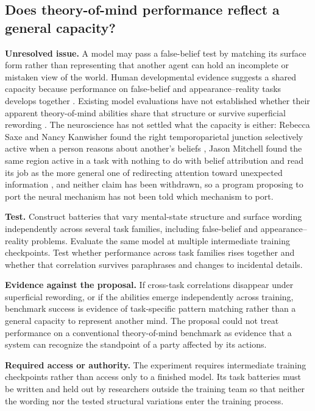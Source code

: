 \subsection*{Does theory-of-mind performance reflect a general capacity?}
\label{sec:A.tom}
\textbf{Unresolved issue.}
A model may pass a false-belief test by matching its surface form rather than representing that another agent can hold an incomplete or mistaken view of the world. Human developmental evidence suggests a shared capacity because performance on false-belief and appearance–reality tasks develops together \autocite{gopnik1988childrens}. Existing model evaluations have not established whether their apparent theory-of-mind abilities share that structure or survive superficial rewording \autocite{ullman2023large}. The neuroscience has not settled what the capacity is either: Rebecca Saxe and Nancy Kanwisher found the right temporoparietal junction selectively active when a person reasons about another's beliefs \autocite{saxe2003people}, Jason Mitchell found the same region active in a task with nothing to do with belief attribution and read its job as the more general one of redirecting attention toward unexpected information \autocite{mitchell2008activity}, and neither claim has been withdrawn, so a program proposing to port the neural mechanism has not been told which mechanism to port.

\textbf{Test.}
Construct batteries that vary mental-state structure and surface wording independently across several task families, including false-belief and appearance–reality problems. Evaluate the same model at multiple intermediate training checkpoints. Test whether performance across task families rises together and whether that correlation survives paraphrases and changes to incidental details.

\textbf{Evidence against the proposal.}
If cross-task correlations disappear under superficial rewording, or if the abilities emerge independently across training, benchmark success is evidence of task-specific pattern matching rather than a general capacity to represent another mind. The proposal could not treat performance on a conventional theory-of-mind benchmark as evidence that a system can recognize the standpoint of a party affected by its actions.

\textbf{Required access or authority.}
The experiment requires intermediate training checkpoints rather than access only to a finished model. Its task batteries must be written and held out by researchers outside the training team so that neither the wording nor the tested structural variations enter the training process.

